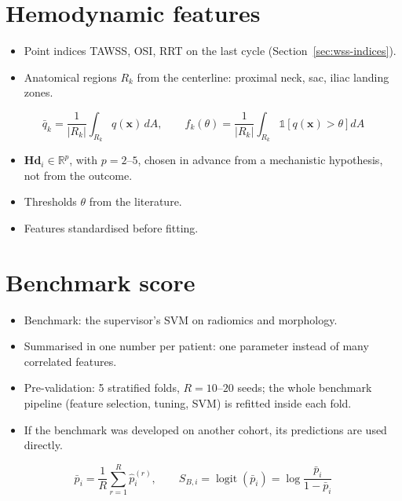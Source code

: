 \section{Hemodynamic features}
\begin{itemize}
    \item Point indices TAWSS, OSI, RRT on the last cycle (Section~\ref{sec:wss-indices}).
    \item Anatomical regions $R_k$ from the centerline: proximal neck, sac, iliac landing zones.
\end{itemize}
\begin{equation}
    \bar{q}_{k} = \frac{1}{|R_k|}\int_{R_k} q(\mathbf{x})\,dA,
    \qquad
    f_{k}(\theta) = \frac{1}{|R_k|}\int_{R_k} \mathbb{1}\left[q(\mathbf{x}) > \theta\right] dA
\end{equation}
\begin{itemize}
    \item $\mathbf{Hd}_i \in \mathbb{R}^p$, with $p = 2$--$5$, chosen in advance from a mechanistic hypothesis, not from the outcome.
    \item Thresholds $\theta$ from the literature. 
    \item Features standardised before fitting.
\end{itemize}

\section{Benchmark score}
\begin{itemize}
    \item Benchmark: the supervisor's SVM on radiomics and morphology.
    \item Summarised in one number per patient: one parameter instead of many correlated features.
    \item Pre-validation: 5 stratified folds, $R = 10$--$20$ seeds; the whole benchmark pipeline (feature selection, tuning, SVM) is refitted inside each fold. 
    \item If the benchmark was developed on another cohort, its predictions are used directly.
\end{itemize}
\begin{equation}
    \bar{p}_i = \frac{1}{R}\sum_{r=1}^{R} \hat{p}_i^{(r)},
    \qquad
    S_{B,i} = \operatorname{logit}(\bar{p}_i) = \log\frac{\bar{p}_i}{1-\bar{p}_i}
\end{equation}

